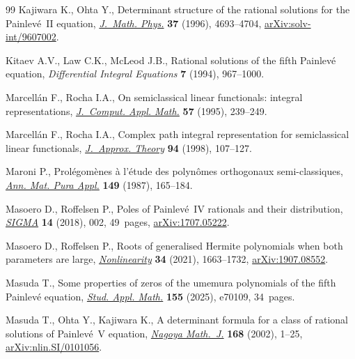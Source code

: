 \begin{thebibliography}{99}
Kajiwara K., Ohta Y., Determinant structure of the rational solutions for the
 {P}ainlev\'e~{II} equation,
 \href{https://doi.org/10.1063/1.531648}{\textit{J.~Math. Phys.}} \textbf{37}
 (1996), 4693--4704,
 \href{http://arxiv.org/abs/solv-int/9607002}{arXiv:solv-int/9607002}.

Kitaev A.V., Law C.K., McLeod J.B., Rational solutions of the fifth
 {P}ainlev\'e equation, \textit{Differential Integral Equations} \textbf{7}
 (1994), 967--1000.

Marcell\'an F., Rocha I.A., On semiclassical linear functionals: integral
 representations,
 \href{https://doi.org/10.1016/0377-0427(93)E0248-K}{\textit{J.~Comput. Appl.
 Math.}} \textbf{57} (1995), 239--249.

Marcell\'an F., Rocha I.A., Complex path integral representation for
 semiclassical linear functionals,
 \href{https://doi.org/10.1006/jath.1998.3190}{\textit{J.~Approx. Theory}}
 \textbf{94} (1998), 107--127.

Maroni P., Prol\'egom\`enes \`a l'\'etude des polyn\^{o}mes orthogonaux
 semi-classiques, \href{https://doi.org/10.1007/BF01773932}{\textit{Ann. Mat.
 Pura Appl.}} \textbf{149} (1987), 165--184.

Masoero D., Roffelsen P., Poles of {P}ainlev\'e~{IV} rationals and their
 distribution, \href{https://doi.org/10.3842/SIGMA.2018.002}{\textit{SIGMA}}
 \textbf{14} (2018), 002, 49~pages,
 \href{http://arxiv.org/abs/1707.05222}{arXiv:1707.05222}.

Masoero D., Roffelsen P., Roots of generalised {H}ermite polynomials when both
 parameters are large,
 \href{https://doi.org/10.1088/1361-6544/abdd93}{\textit{Nonlinearity}}
 \textbf{34} (2021), 1663--1732,
 \href{http://arxiv.org/abs/1907.08552}{arXiv:1907.08552}.

Masuda T., Some properties of zeros of the umemura polynomials of the fifth
 {P}ainlev\'e equation,
 \href{https://doi.org/10.1111/sapm.70109}{\textit{Stud. Appl. Math.}}
 \textbf{155} (2025), e70109, 34~pages.

Masuda T., Ohta Y., Kajiwara K., A determinant formula for a class of rational
 solutions of {P}ainlev\'e~{V} equation,
 \href{https://doi.org/10.1017/S0027763000008321}{\textit{Nagoya Math.~J.}}
 \textbf{168} (2002), 1--25,
 \href{http://arxiv.org/abs/nlin.SI/0101056}{arXiv:nlin.SI/0101056}.


\end{thebibliography}
